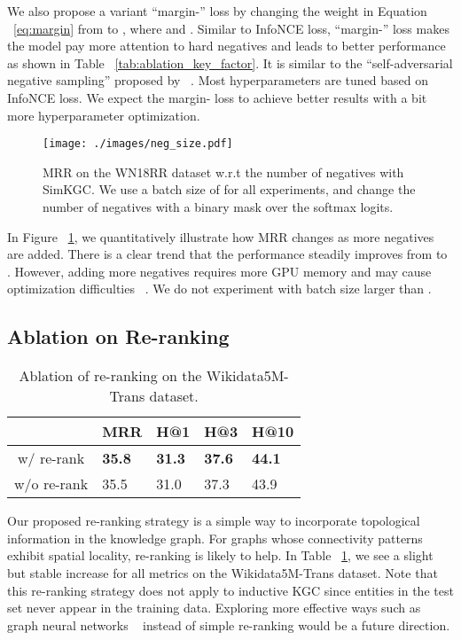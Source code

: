 \documentclass[11pt]{article}
\begin{document}
We also propose a variant ``margin-'' loss
by changing the weight in Equation ~\ref{eq:margin} from 
to ,
where 
and .
Similar to InfoNCE loss,
``margin-'' loss makes the model pay more attention to hard negatives
and leads to better performance as shown in Table ~\ref{tab:ablation_key_factor}.
It is similar to the ``self-adversarial negative sampling'' proposed by ~\citet{sun2018rotate}.
Most hyperparameters are tuned based on InfoNCE loss.
We expect the margin- loss to achieve better results with a bit more hyperparameter optimization.

\begin{figure}[ht]
\begin{center}
 \texttt{[image: ./images/neg\_size.pdf]}
 \caption{MRR on the WN18RR dataset w.r.t the number of negatives with SimKGC.
 We use a batch size of  for all experiments,
 and change the number of negatives with a binary mask over the softmax logits.}
 \label{fig:neg_size}
\end{center}
\end{figure}

In Figure ~\ref{fig:neg_size},
we quantitatively illustrate how MRR changes as more negatives are added.
There is a clear trend that
the performance steadily improves from  to .
However,
adding more negatives requires more GPU memory
and may cause optimization difficulties ~\citep{You2020LargeBO,chen2020simple}.
We do not experiment with batch size larger than .

\subsection{Ablation on Re-ranking}

\begin{table}[ht]
\centering
\begin{tabular}{c|llll}
\hline
 & MRR & H@1 & H@3 & H@10 \\ \hline
w/ re-rank &  \textbf{35.8} & \textbf{31.3} & \textbf{37.6} & \textbf{44.1} \\
w/o re-rank & 35.5 & 31.0 & 37.3 & 43.9 \\ \hline
\end{tabular}
\caption{Ablation of re-ranking on the Wikidata5M-Trans dataset.}
\label{tab:re-rank}
\end{table}

Our proposed re-ranking strategy is a simple way
to incorporate topological information in the knowledge graph.
For graphs whose connectivity patterns exhibit spatial locality,
re-ranking is likely to help.
In Table ~\ref{tab:re-rank},
we see a slight but stable increase for all metrics on the Wikidata5M-Trans dataset.
Note that this re-ranking strategy does not apply
to inductive KGC
since entities in the test set never appear in the training data.
Exploring more effective ways such as graph neural networks ~\citep{Wu2019ACS}
instead of simple re-ranking would be a future direction.
\end{document}
